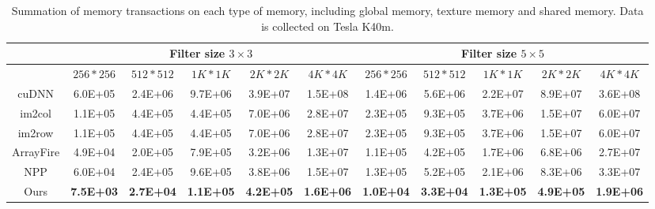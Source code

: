 \documentclass[sigplan,review,anonymous]{acmart}\settopmatter{printfolios=true,printccs=false,printacmref=false}
\begin{document}
\begin{table}[]
\caption{Summation of memory transactions on each type of memory, including global memory, texture memory and shared memory. Data is collected on Tesla K40m.}
\label{tab:2dmemtrans}
\begin{tabular}{c|ccccc|ccccc}
\hline
\multicolumn{1}{l|}{}                                  & \multicolumn{5}{c|}{Filter size $3 \times 3$}                                                & \multicolumn{5}{c}{Filter size $5 \times 5$}                                                \\ \hline
                                                       & $256 * 256$      & $512 * 512$      & $1K * 1K$        & $2K * 2K$        & $4K * 4K$        & $256 * 256$      & $512 * 512$      & $1K * 1K$        & $2K * 2K$        & $4K * 4K$        \\ \hline
cuDNN                                                  & 6.0E+05          & 2.4E+06          & 9.7E+06          & 3.9E+07          & 1.5E+08          & 1.4E+06          & 5.6E+06          & 2.2E+07          & 8.9E+07          & 3.6E+08          \\
 im2col & 1.1E+05          & 4.4E+05          & 4.4E+05          & 7.0E+06          & 2.8E+07          & 2.3E+05          & 9.3E+05          & 3.7E+06          & 1.5E+07          & 6.0E+07          \\
im2row & 1.1E+05          & 4.4E+05          & 4.4E+05          & 7.0E+06          & 2.8E+07          & 2.3E+05          & 9.3E+05          & 3.7E+06          & 1.5E+07          & 6.0E+07          \\
ArrayFire                                              & 4.9E+04          & 2.0E+05          & 7.9E+05          & 3.2E+06          & 1.3E+07          & 1.1E+05          & 4.2E+05          & 1.7E+06          & 6.8E+06          & 2.7E+07          \\
NPP                                                    & 6.0E+04          & 2.4E+05          & 9.6E+05          & 3.8E+06          & 1.5E+07          & 1.3E+05          & 5.2E+05          & 2.1E+06          & 8.3E+06          & 3.3E+07          \\
Ours                                                   & \textbf{7.5E+03} & \textbf{2.7E+04} & \textbf{1.1E+05} & \textbf{4.2E+05} & \textbf{1.6E+06} & \textbf{1.0E+04} & \textbf{3.3E+04} & \textbf{1.3E+05} & \textbf{4.9E+05} & \textbf{1.9E+06} \\ \hline
\end{tabular}
\end{table}
\end{document}
